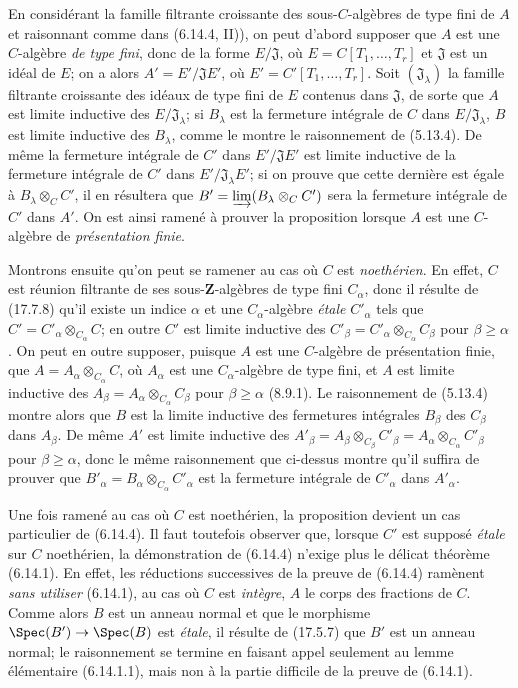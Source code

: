 En considérant la famille filtrante croissante des sous-$C$-algèbres de type fini de $A$ et raisonnant comme dans (6.14.4, II)), on peut d'abord supposer que $A$ est une $C$-algèbre \emph{de type fini}, donc de la forme $E/\mathfrak J$, où $E=C[T_1,\ldots,T_r]$ et $\mathfrak J$ est un idéal de $E$; on a alors $A'=E'/\mathfrak JE'$, où $E'=C'[T_1,\ldots,T_r]$. Soit $(\mathfrak J_\lambda)$ la famille filtrante croissante des idéaux de type fini de $E$ contenus dans $\mathfrak J$, de sorte que $A$ est limite inductive des $E/\mathfrak J_\lambda$; si $B_\lambda$ est la fermeture intégrale de $C$ dans $E/\mathfrak J_\lambda$, $B$ est limite inductive des $B_\lambda$, comme le montre le raisonnement de (5.13.4). De même la fermeture intégrale de $C'$ dans $E'/\mathfrak JE'$ est limite inductive de la fermeture intégrale de $C'$ dans $E'/\mathfrak J_\lambda E'$; si on prouve que cette dernière est égale à $B_\lambda\otimes_C C'$, il en résultera que $B'=\varinjlim(B_\lambda\otimes_C C')$ sera la fermeture intégrale de $C'$ dans $A'$. On est ainsi ramené à prouver la proposition lorsque $A$ est une $C$-algèbre de \emph{présentation finie}.

Montrons ensuite qu'on peut se ramener au cas où $C$ est \emph{noethérien}. En effet, $C$ est réunion filtrante de ses sous-$\mathbf Z$-algèbres de type fini $C_\alpha$, donc il résulte de (17.7.8) qu'il existe un indice $\alpha$ et une $C_\alpha$-algèbre \emph{étale} $C'_\alpha$ tels que $C'=C'_\alpha\otimes_{C_\alpha}C$; en outre $C'$ est limite inductive des $C'_\beta=C'_\alpha\otimes_{C_\alpha}C_\beta$ pour $\beta\geq\alpha$. On peut en outre supposer, puisque $A$ est une $C$-algèbre de présentation finie, que $A=A_\alpha\otimes_{C_\alpha}C$, où $A_\alpha$ est une $C_\alpha$-algèbre de type fini, et $A$ est limite inductive des $A_\beta=A_\alpha\otimes_{C_\alpha}C_\beta$ pour $\beta\geq\alpha$ (8.9.1). Le raisonnement de (5.13.4) montre alors que $B$ est la limite inductive des fermetures intégrales $B_\beta$ des $C_\beta$ dans $A_\beta$. De même $A'$ est limite inductive des $A'_\beta=A_\beta\otimes_{C_\beta}C'_\beta=A_\alpha\otimes_{C_\alpha}C'_\beta$ pour $\beta\geq\alpha$, donc le même raisonnement que ci-dessus montre qu'il suffira de prouver que $B'_\alpha=B_\alpha\otimes_{C_\alpha}C'_\alpha$ est la fermeture intégrale de $C'_\alpha$ dans $A'_\alpha$.

Une fois ramené au cas où $C$ est noethérien, la proposition devient un cas particulier de (6.14.4). Il faut toutefois observer que, lorsque $C'$ est supposé \emph{étale} sur $C$ noethérien, la démonstration de (6.14.4) n'exige plus le délicat théorème (6.14.1). En effet, les réductions successives de la preuve de (6.14.4) ramènent \emph{sans utiliser} (6.14.1), au cas où $C$ est \emph{intègre}, $A$ le corps des fractions de $C$. Comme alors $B$ est un anneau normal et que le morphisme $\Spec(B')\to\Spec(B)$ est \emph{étale}, il résulte de (17.5.7) que $B'$ est un anneau normal; le raisonnement se termine en faisant appel seulement au lemme élémentaire (6.14.1.1), mais non à la partie difficile de la preuve de (6.14.1).

